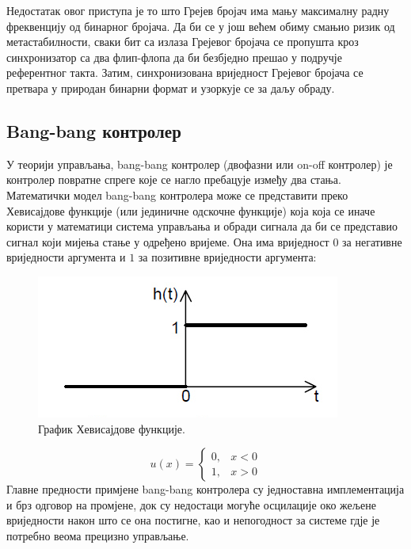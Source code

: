 \documentclass[master]{finthesis}
\begin{document}
Недостатак овог приступа је то што Грејев бројач има мању максималну радну фреквенцију од бинарног бројача. Да би се у још већем обиму смањио ризик од метастабилности, сваки бит са излаза Грејевог бројача се пропушта кроз синхронизатор са два флип-флопа да би безбједно прешао у подручје референтног такта. Затим, синхронизована вриједност Грејевог бројача се претвара у природан бинарни формат и узоркује се за даљу обраду.

\subsection{Bang-bang контролер} \label{section:bang_bang}
У теорији управљања, bang-bang контролер (двофазни или on-off контролер) је контролер повратне спреге које се нагло пребацује између два стања. Математички модел bang-bang контролера може се представити преко Хевисајдове функције (или јединичне одскочне функције) која која се иначе користи у математици система управљања и обради сигнала да би се представио сигнал који мијења стање у одређено вријеме. Она има вриједност $0$ за негативне вриједности аргумента и $1$ за позитивне вриједности аргумента:
\begin{figure}[!h]
	 \centering
	 \includegraphics[scale=0.7]{slike/heaviside.png}
	 \caption{График Хевисајдове функције.}
	 \label{heaviside}
\end{figure}
\begin{equation}
	\label{eq_heaviside}
	u(x)= \begin{cases}
		0, & x < 0 \\
		1, & x > 0
		\end{cases}
\end{equation}
Главне предности примјене bang-bang контролера су једноставна имплементација и брз одговор на промјене, док су недостаци могуће осцилације око жељене вриједности након што се она постигне, као и непогодност за системе гдје је потребно веома прецизно управљање. \par 
\end{document}
